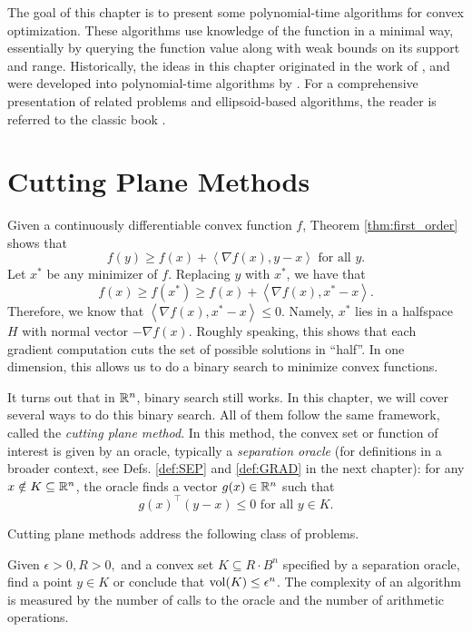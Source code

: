 The goal of this chapter is to present some polynomial-time algorithms
for convex optimization. These algorithms use knowledge of the function
in a minimal way, essentially by querying the function value along
with weak bounds on its support and range. Historically, the ideas
in this chapter originated in the work of \cite{Grunbaum1960,yudin1976evaluation},
and were developed into polynomial-time algorithms by \cite{khachiyan1980polynomial,grotschel1981ellipsoid,bertsimas2004solving}.
For a comprehensive presentation of related problems and ellipsoid-based
algorithms, the reader is referred to the classic book \cite{grotschel2012geometric}. 

\section{Cutting Plane Methods\label{sec:Cutting-Plane-Methods}}

Given a continuously differentiable convex function $f$, Theorem
\ref{thm:first_order} shows that
\begin{equation}
f(y)\geq f(x)+\left\langle \nabla f(x),y-x\right\rangle \text{ for all }y.\label{eq:sub_grad_def}
\end{equation}
Let $x^{*}$ be any minimizer of $f$. Replacing $y$ with $x^{*}$,
we have that 
\[
f(x)\geq f(x^{*})\geq f(x)+\left\langle \nabla f(x),x^{*}-x\right\rangle .
\]
Therefore, we know that $\left\langle \nabla f(x),x^{*}-x\right\rangle \leq0$.
Namely, $x^{*}$ lies in a halfspace $H$ with normal vector $-\nabla f(x)$.
Roughly speaking, this shows that each gradient computation cuts the
set of possible solutions in ``half''. In one dimension, this allows
us to do a binary search to minimize convex functions. 

It turns out that in $\mathbb{R}^{n}$, binary search still works. In this chapter,
we will cover several ways to do this binary search. All of them follow
the same framework, called the \emph{cutting plane method}. In this
method, the convex set or function of interest is given by an oracle,
typically a \emph{separation oracle} (for definitions in a broader
context, see Defs. \ref{def:SEP} and \ref{def:GRAD} in the next
chapter): for any $x\notin K\subseteq\mathbb{R}^{n}$, the oracle finds a
vector $g(x)\in\mathbb{R}^{n}$ such that
\[
g(x)^{\top}(y-x)\leq0\text{ for all }y\in K.
\]

Cutting plane methods address the following class of problems.
\begin{problem}
\label{prob:abstract_convex_problem}Given $\epsilon>0,R>0,$ and
a convex set $K\subseteq R\cdot B^{n}$ specified by a separation
oracle, find a point $y\in K$ or conclude that $\mathrm{vol}(K)\leq\epsilon^{n}$.
The complexity of an algorithm is measured by the number of calls
to the oracle and the number of arithmetic operations.
\end{problem}

